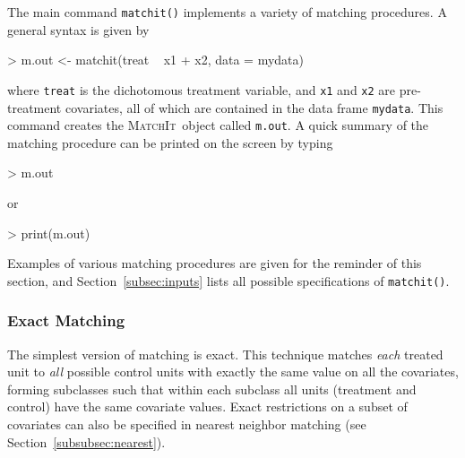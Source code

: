 \documentclass[oneside,letterpaper,titlepage]{article}
\newcommand{\MatchIt}{\textsc{MatchIt}}
\begin{document}
The main command \texttt{matchit()} implements a variety of matching
procedures.  A general syntax is given by
\begin{Schunk}
\begin{Sinput}
> m.out <- matchit(treat ~ x1 + x2, data = mydata)
\end{Sinput}
\end{Schunk}
where {\tt treat} is the dichotomous treatment variable, and {\tt x1}
and {\tt x2} are pre-treatment covariates, all of which are contained
in the data frame {\tt mydata}.  This command creates the
\MatchIt\, object called \texttt{m.out}.  A quick summary of the
matching procedure can be printed on the screen by typing
\begin{Schunk}
\begin{Sinput}
> m.out
\end{Sinput}
\end{Schunk}
or
\begin{Schunk}
\begin{Sinput}
> print(m.out)
\end{Sinput}
\end{Schunk}
Examples of various matching procedures are given for the reminder of
this section, and Section~\ref{subsec:inputs} lists all possible
specifications of {\tt matchit()}.

\subsubsection{Exact Matching}
\label{subsubsec:exact}

The simplest version of matching is exact.  This technique matches
\emph{each} treated unit to \emph{all} possible control units with
exactly the same value on all the covariates, forming subclasses such
that within each subclass all units (treatment and control) have the
same covariate values.  Exact restrictions on a subset of covariates
can also be specified in nearest neighbor matching (see
Section~\ref{subsubsec:nearest}).
\end{document}
